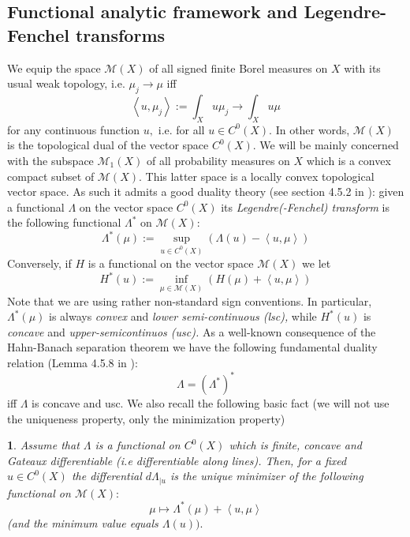 \documentclass[11pt,oneside,english]{amsart}
\numberwithin{equation}{section}
\numberwithin{figure}{section}
\theoremstyle{plain}
\theoremstyle{plain}
\theoremstyle{plain}
\newtheorem{lem}[thm]{\protect\lemmaname}
\theoremstyle{plain}
\theoremstyle{remark}
\theoremstyle{definition}
\providecommand{\lemmaname}{Lemma}
\begin{document}
\subsection{Functional analytic framework and Legendre-Fenchel transforms}

We equip the space $\mathcal{M}(X)$ of all signed finite Borel measures
on $X$ with its  usual weak topology, i.e. $\mu_{j}\rightarrow\mu$
iff 
\[
\left\langle u,\mu_{j}\right\rangle :=\int_{X}u\mu_{j}\rightarrow\int_{X}u\mu
\]
 for any continuous function $u,$ i.e. for all $u\in C^{0}(X).$
In other words, $\mathcal{M}(X)$ is the topological dual of the vector
space $C^{0}(X).$ We will be mainly concerned with the subspace $\mathcal{M}_{1}(X)$
of all probability measures on $X$ which is a convex compact subset
of $\mathcal{M}(X).$ This latter space is a locally convex topological
vector space. As such it admits a good duality theory (see section
4.5.2 in \cite{de-ze}): given a functional $\Lambda$ on the vector
space $C^{0}(X)$ its \emph{Legendre(-Fenchel) transform} is the following
functional $\Lambda^{*}$ on $\mathcal{M}(X):$ 
\[
\Lambda^{*}(\mu):=\sup_{u\in C^{0}(X)}(\Lambda(u)-\left\langle u,\mu\right\rangle )
\]
 Conversely, if $H$ is a functional on the vector space $\mathcal{M}(X)$
we let 
\[
H^{*}(u):=\inf_{\mu\in\mathcal{M}(X)}(H(\mu)+\left\langle u,\mu\right\rangle )
\]
 Note that we are using rather non-standard sign conventions. In particular,
$\Lambda^{*}(\mu)$ is always \emph{convex }and \emph{lower semi-continuous
(lsc),} while $H^{*}(u)$ is \emph{concave} and \emph{upper-semicontinuos
(usc). }As a well-known consequence of the Hahn-Banach separation
theorem we have the following fundamental duality relation (Lemma
4.5.8 in \cite{de-ze}): 
\begin{equation}
\Lambda=(\Lambda^{*})^{*}\label{eq:dualiy}
\end{equation}
 iff $\Lambda$ is concave and usc. We also recall the following basic
fact (we will not use the uniqueness property, only the minimization
property) 
\begin{lem}
\label{lem:maxim is differ}Assume that $\Lambda$ is a functional
on $C^{0}(X)$ which is finite, concave and Gateaux differentiable
(i.e differentiable along lines). Then, for a fixed $u\in C^{0}(X)$
the differential $d\Lambda_{|u}$ is the unique minimizer of the following
functional on $\mathcal{M}(X):$ 
\begin{equation}
\mu\mapsto\Lambda^{*}(\mu)+\left\langle u,\mu\right\rangle \label{eq:functional in lemma max diff}
\end{equation}
 (and the minimum value equals $\Lambda(u)).$\end{lem}
\end{document}

